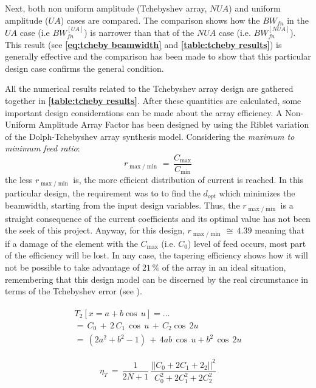 \documentclass[10 pt,a4paper,twocolumn]{article}
\begin{document}
{Next, both non uniform amplitude (Tchebyshev array, $NUA$) and uniform amplitude ($UA$)  cases are compared. The comparison shows how the $BW_{fn}$ in the $UA$ case (i.e $BW_{fn}^{[UA]}$) is narrower than that of the $NUA$ case (i.e. $BW_{fn}^{[NUA]}$). This result (see \textbf{\cref{eq:tcheby beamwidth}} and \textbf{\cref{table:tcheby results}}) is generally effective and the comparison has been made to show that this particular design case confirms the general condition. 



\indent 

All the numerical results related to the Tchebyshev array design are gathered together in \textbf{\cref{table:tcheby results}}. After these quantities are calculated, some important design considerations can be made about the array efficiency. A Non-Uniform Amplitude Array Factor has been designed by using the Riblet variation of the Dolph-Tchebyshev array synthesis model. Considering the \emph{maximum to minimum feed ratio}: \[r_{\max/\min}\,=\,\frac{C_{\max}}{C_{\min}}\] 
the less $r_{\max/\min}$ is, the more efficient distribution of current is reached. In this particular design, the requirement was to to find the $d_{opt}$ which minimizes the beamwidth, starting from the input design variables. Thus, the $r_{\max/\min}$ is a straight consequence of the current coefficients and its optimal value has not been the seek of this project. Anyway, for this design, $r_{\max/\min}\,\cong\,4.39$ meaning that if a damage of the element with the $C_{\max}$ (i.e. $C_0$) level of feed occurs, most part of the efficiency will be lost. In any case, the tapering efficiency shows how it will not be possible to take advantage of $21\,\%$ of the array in an ideal situation, remembering that this design model can be discerned by the real circumstance in terms of the Tchebyshev error (see \textbf{\cite{Balanis1}}). 

\begin{equation}\begin{split}
		\begin{aligned}
			T_2\left[x=a+b\cos\,u\right]=\dots\\
			=\,C_0\,+\,2\,C_1\,\cos\,u\,+\,C_2\cos\,2u\\
			=\,(2a^2+b^2-1)\,+\,4ab\,\cos\,u+b^2\,\cos\,2u
			\label{eq:tcheby poly coeff}
		\end{aligned}
	\end{split}
\end{equation}

\begin{equation}
	\eta_T\,=\,\frac{1}{2N+1}\,\frac{||C_0+2C_1+2_2||^2}{C_0^2+2C_1^2+2C_2^2}
	\label{eq:tapering efficiency}
\end{equation}

}
\end{document}
